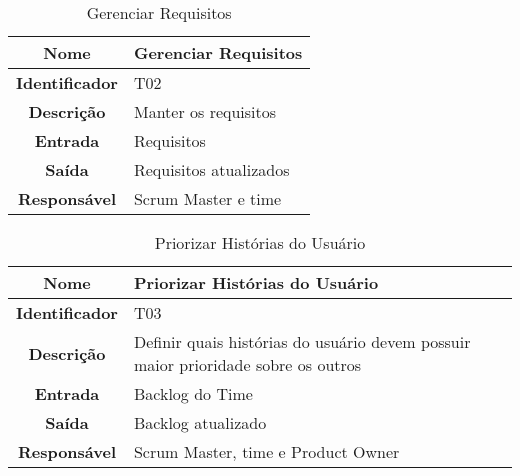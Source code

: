 {              \begin{table}[H]
                \centering
                \caption{Gerenciar Requisitos}
                \begin{tabular}{c|p{10cm}}
                    \hline
                    \textbf{Nome}            & Gerenciar Requisitos\\
                    \hline
                    \textbf{Identificador} & T02\\ 
                    \hline
                    \textbf{Descrição}   & Manter os requisitos\\ 
                    \hline
                    \textbf{Entrada}           & Requisitos\\
                    \hline
                    \textbf{Saída}            &  Requisitos atualizados\\
                    \hline
                    \textbf{Responsável}            & Scrum Master e time \\
                    \hline                    
                \end{tabular}
            \end{table}


             \begin{table}[H]
                \centering
                \caption{Priorizar Histórias do Usuário}
                \begin{tabular}{c|p{10cm}}
                    \hline
                    \textbf{Nome}            & Priorizar Histórias do Usuário\\
                    \hline
                    \textbf{Identificador} & T03\\ 
                    \hline
                    \textbf{Descrição}   & Definir quais histórias do usuário devem possuir maior prioridade sobre os outros\\ 
                    \hline
                    \textbf{Entrada}           & Backlog do Time\\
                    \hline
                    \textbf{Saída}            &  Backlog atualizado\\
                    \hline
                    \textbf{Responsável}            &  Scrum Master, time e Product Owner\\
                    \hline                    
                \end{tabular}
            \end{table}

}
